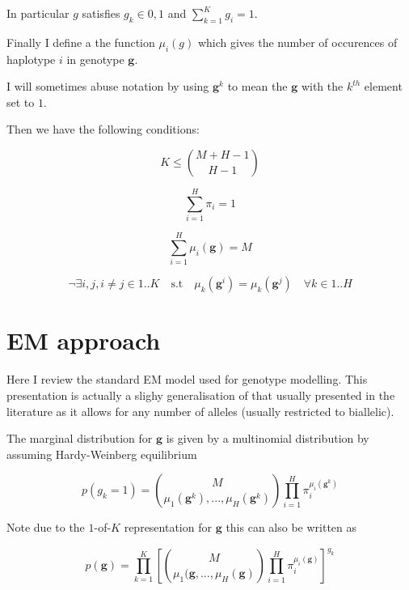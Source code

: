 \documentclass{article}
\begin{document}
In particular $g$ satisfies $g_k \in {0, 1}$ and $\sum_{k = 1}^{K} g_i = 1$.

Finally I define a the function $\mu_i(g)$ which gives the number of occurences of haplotype $i$ in genotype $\boldsymbol{g}$.

I will sometimes abuse notation by using $\boldsymbol{g}^k$ to mean the $\boldsymbol{g}$ with the $k^{th}$ element set to $1$.

Then we have the following conditions:

\begin{equation} 
    K \le \binom{M + H - 1}{H - 1}
\end{equation}

\begin{equation} 
    \sum_{i = 1}^{H} \pi_i = 1
\end{equation}

\begin{equation} 
    \sum_{i = 1}^{H} \mu_i(\boldsymbol{g}) = M
\end{equation}

\begin{equation} 
    \neg\exists i,j, i \ne j\in {1..K} \quad \text{s.t} \quad \mu_k(\boldsymbol{g}^i) = \mu_k(\boldsymbol{g}^j) \quad \forall k \in {1..H}
\end{equation}

\section{EM approach}

Here I review the standard EM model used for genotype modelling. This presentation is actually a slighy generalisation of that usually presented in the literature as it allows for any number of alleles (usually restricted to biallelic).

The marginal distribution for $\boldsymbol{g}$ is given by a multinomial distribution by assuming Hardy-Weinberg equilibrium

\begin{equation} 
    p(g_k = 1) = \binom{M}{\mu_1(\boldsymbol{g}^k),...,\mu_H(\boldsymbol{g}^k)} \prod_{i = 1}^H \pi_i^{\mu_i(\boldsymbol{g}^k)}
\end{equation}

Note due to the $1$-of-$K$ representation for $\boldsymbol{g}$ this can also be written as

\begin{equation} 
    p(\boldsymbol{g}) = \prod_{k = 1}^K \left[\binom{M}{\mu_1(\boldsymbol{g},...,\mu_H(\boldsymbol{g})} \prod_{i = 1}^H \pi_i^{\mu_i(\boldsymbol{g})}\right]^{g_k}
\end{equation}
\end{document}
